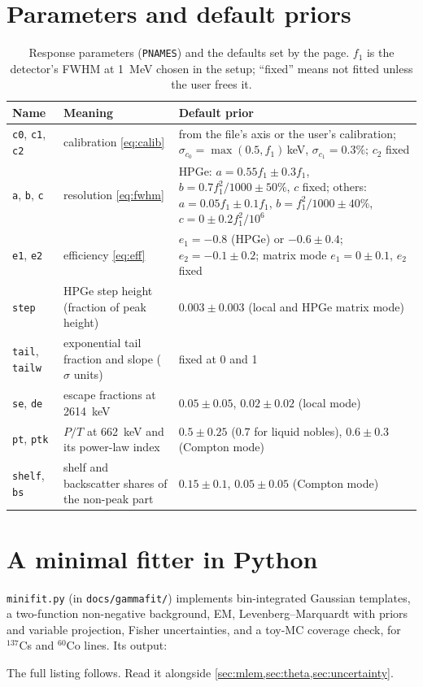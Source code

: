 \documentclass[11pt]{article}
\newcommand{\code}[1]{\texttt{#1}}
\newcommand{\nuc}[2]{${}^{#1}$#2}
\begin{document}
\section{Parameters and default priors}\label{app:params}
\begin{table}[h]
\centering\small
\caption{Response parameters (\code{PNAMES}) and the defaults set by the page. $f_1$ is the detector's FWHM at \SI{1}{MeV} chosen in the setup; ``fixed'' means not fitted unless the user frees it.}
\begin{tabularx}{\linewidth}{@{}llX@{}}
\toprule
Name & Meaning & Default prior\\
\midrule
\code{c0}, \code{c1}, \code{c2} & calibration \cref{eq:calib} & from the file's axis or the user's calibration; $\sigma_{c_0}=\max(0.5,f_1)$\,keV, $\sigma_{c_1}=0.3\%$; $c_2$ fixed\\
\code{a}, \code{b}, \code{c} & resolution \cref{eq:fwhm} & HPGe: $a=0.55f_1\pm0.3f_1$, $b=0.7f_1^2/1000\pm50\%$, $c$ fixed; others: $a=0.05f_1\pm0.1f_1$, $b=f_1^2/1000\pm40\%$, $c=0\pm0.2f_1^2/10^6$\\
\code{e1}, \code{e2} & efficiency \cref{eq:eff} & $e_1=-0.8$ (HPGe) or $-0.6\pm0.4$; $e_2=-0.1\pm0.2$; matrix mode $e_1=0\pm0.1$, $e_2$ fixed\\
\code{step} & HPGe step height (fraction of peak height) & $0.003\pm0.003$ (local and HPGe matrix mode)\\
\code{tail}, \code{tailw} & exponential tail fraction and slope ($\sigma$ units) & fixed at 0 and 1\\
\code{se}, \code{de} & escape fractions at \SI{2614}{keV} & $0.05\pm0.05$, $0.02\pm0.02$ (local mode)\\
\code{pt}, \code{ptk} & $P/T$ at \SI{662}{keV} and its power-law index & $0.5\pm0.25$ ($0.7$ for liquid nobles), $0.6\pm0.3$ (Compton mode)\\
\code{shelf}, \code{bs} & shelf and backscatter shares of the non-peak part & $0.15\pm0.1$, $0.05\pm0.05$ (Compton mode)\\
\bottomrule
\end{tabularx}
\end{table}

\section{A minimal fitter in Python}\label{app:minifit}
\code{minifit.py} (in \code{docs/gammafit/}) implements bin-integrated Gaussian templates, a two-function non-negative background, EM, Levenberg--Marquardt with priors and variable projection, Fisher uncertainties, and a toy-MC coverage check, for \nuc{137}{Cs} and \nuc{60}{Co} lines. Its output:

The full listing follows. Read it alongside \cref{sec:mlem,sec:theta,sec:uncertainty}.

\end{document}
